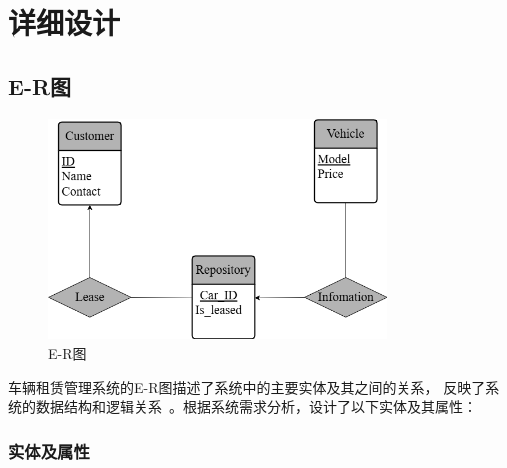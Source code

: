 \documentclass[UTF8,a4paper,12pt]{ctexart}
\begin{document}
\section{详细设计}

\subsection{E-R图}

\begin{figure}[htbp]  %
    \centering  %
    \includegraphics[width=0.8\textwidth]{pic/er.png}  %
    \caption{E-R图}  %
    \label{fig:er}  %
\end{figure}

车辆租赁管理系统的E-R图描述了系统中的主要实体及其之间的关系，
反映了系统的数据结构和逻辑关系~\cite{silberschatz2011database}。根据系统需求分析，设计了以下实体及其属性：

\subsubsection{实体及属性}
\end{document}
